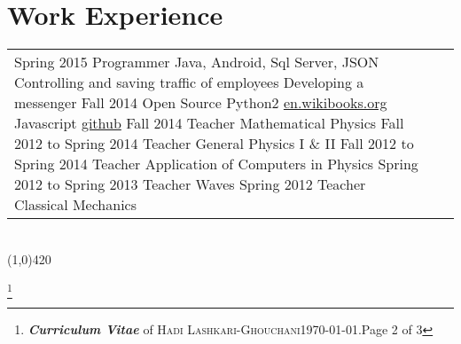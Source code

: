 \documentclass[10pt]{article}
\newcommand{\maxpages}{3}
\newcommand{\maxpages}{2}
\newcommand\HRule{\hspace*{.8cm}\line(1,0){420}\\}
\newenvironment{Record}[1]
{
    \vspace{-0.35cm}
    \section*{#1}
        \vspace{-0.1cm}
        \begin{tabular}
}
{
        \end{tabular}\\
        \HRule
}
\newcommand{\FootNote}[1]{\let\thefootnote\relax\footnote{\textbf{\textit{Curriculum Vitae}} of \textsc{Hadi Lashkari-Ghouchani}\qquad\today.\qquad Page #1 of \maxpages}}
\begin{document}
\begin{Record}{Work Experience}{l l l}
    \WorkExperience{\href{http://sohasys.ir}{Soha Company}}
        {Spring 2015}
        {Programmer}
        {Java, Android, Sql Server, JSON}
        {Controlling and saving traffic of employees}
        {Developing a messenger}
        {}%
    \WorkExperience{Persian Calendar}
        {Fall 2014}
        {Open Source}
        {Python2}
        {\href{http://en.wikibooks.org/wiki/Persian_Calendar}{en.wikibooks.org}}
        {Javascript}
        {\href{http://github.com/hadilq/persianCalendar}{github}}
    \WorkExperience{Payame-Noor University}
        {Fall 2014}
        {Teacher}
        {Mathematical Physics}
        {}{}{}%
    \WorkExperience{Sadjad University}
        {Fall 2012 to Spring 2014}
        {Teacher}
        {General Physics I \& II}
        {}{}{}%
    \WorkExperience{Payame-Noor University}
        {Fall 2012 to Spring 2014}
        {Teacher}
        {Application of Computers in Physics}
        {}{}{}%
    \WorkExperience{Payame-Noor University}
        {Spring 2012 to Spring 2013}
        {Teacher}
        {Waves}
        {}{}{}%
    \WorkExperience{Payame-Noor University}
        {Spring 2012}
        {Teacher}
        {Classical Mechanics}
        {}{}{}%
\end{Record}



\FootNote{2}


\newcommand{\Reference}[5]{
    \multicolumn{2}{l}{\textbf{\textsl{ #1}}}\\
    \quad#2&\textit{#3}\\
    &\textit{#4}\\
    &\textit{#5}\\
}
\end{document}
